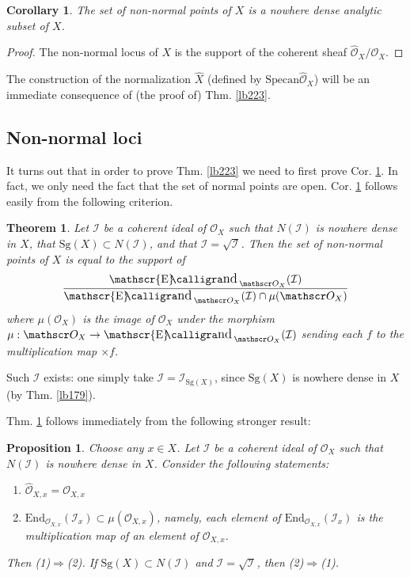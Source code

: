 \documentclass[12pt,b5paper,notitlepage]{report}
\theoremstyle{definition}
\theoremstyle{plain}
\newtheorem{thm}[df]{Theorem}
\newtheorem{pp}[df]{Proposition}
\newtheorem{co}[df]{Corollary}
\DeclareMathOperator{\send}{\mathscr{E}\text{\kern -3pt {\calligra\large nd}}\,}
\newcommand{\mc}{\mathcal}
\newcommand{\wht}{\widehat}
\newcommand{\End}{\mathrm{End}} %
\newcommand{\scr}{\mathscr}
\newcommand{\Specan}{\mathrm{Specan}}
\newcommand{\Sg}{\mathrm{Sg}}
\newcommand{\Owht}{\widehat{\scr O}}
\numberwithin{equation}{section}
\begin{document}
\begin{co}\label{lb224}
The set of non-normal points of $X$ is a nowhere dense analytic subset of $X$.
\end{co}

\begin{proof}
The non-normal locus of $X$ is the support of the coherent sheaf $\Owht_X/\scr O_X$.
\end{proof}

The construction of the normalization $\wht X$ (defined by $\Specan\Owht_X$) will be an immediate consequence of (the proof of) Thm. \ref{lb223}.

\subsection{Non-normal loci}


It turns out that in order to prove Thm. \ref{lb223} we need to first prove Cor. \ref{lb224}. In fact, we only need the fact that the set of normal points are open. Cor. \ref{lb224} follows easily from the following criterion.


\begin{thm}\label{lb227}
Let $\mc I$ be a coherent ideal of $\scr O_X$ such that $N(\mc I)$ is nowhere dense in $X$, that $\Sg(X)\subset N(\mc I)$, and that $\mc I=\sqrt{\mc I}$. Then the set of non-normal points of $X$ is equal to the support of
\begin{align*}
\frac{\send_{\scr O_X}(\mc I)}{\send_{\scr O_X}(\mc I)\cap\mu(\scr O_X)}
\end{align*}
where $\mu(\scr O_X)$ is the image of $\scr O_X$ under the morphism $\mu:\scr O_X\rightarrow\send_{\scr O_X}(\mc I)$ sending each $f$ to the multiplication map $\times f$.
\end{thm}

Such $\mc I$ exists: one simply take $\mc I=\scr I_{\Sg(X)}$, since $\Sg(X)$ is nowhere dense in $X$ (by Thm. \ref{lb179}).

Thm. \ref{lb227} follows immediately from the following stronger result:

\begin{pp}\label{lb362}
Choose any $x\in X$. Let $\mc I$ be a coherent ideal of $\scr O_X$ such that $N(\mc I)$ is nowhere dense in $X$. Consider the following statements:
\begin{enumerate}[label=(\arabic*)]
\item $\Owht_{X,x}=\scr O_{X,x}$
\item $\displaystyle\End_{\scr O_{X,x}}(\mc I_x)\subset \mu(\scr O_{X,x})$, namely, each element of $\End_{\scr O_{X,x}}(\mc I_x)$ is the multiplication map of an element of $\scr O_{X,x}$.
\end{enumerate}
Then (1)$\Rightarrow$(2). If $\Sg(X)\subset N(\mc I)$ and $\mc I=\sqrt{\mc I}$, then (2)$\Rightarrow$(1).
\end{pp}
\end{document}
